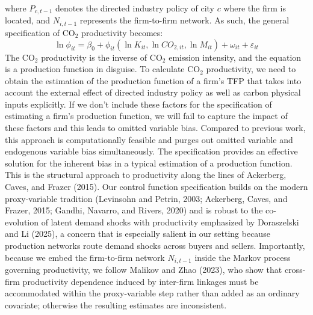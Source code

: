 \documentclass[11pt,a4paper]{article}
\begin{document}
where $P_{c,t-1}$ denotes the directed industry policy of city $c$ where the firm is located, and $N_{i,t-1}$ represents the firm-to-firm network. As such, the general specification of CO$_2$ productivity becomes:
\begin{equation}
\ln\phi_{it} = \beta_0 + \phi_{it}(\ln K_{it}, \ln CO_{2,it}, \ln M_{it}) + \omega_{it} + \varepsilon_{it}
\end{equation}
The CO$_2$ productivity is the inverse of CO$_2$ emission intensity, and the equation is a production function in disguise. To calculate CO$_2$ productivity, we need to obtain the estimation of the production function of a firm's TFP that takes into account the external effect of directed industry policy as well as carbon physical inputs explicitly. If we don't include these factors for the specification of estimating a firm's production function, we will fail to capture the impact of these factors and this leads to omitted variable bias. Compared to previous work, this approach is computationally feasible and purges out omitted variable and endogenous variable bias simultaneously. The specification provides an effective solution for the inherent bias in a typical estimation of a production function. This is the structural approach to productivity along the lines of Ackerberg, Caves, and Frazer (2015). Our control function specification builds on the modern proxy-variable tradition (Levinsohn and Petrin, 2003; Ackerberg, Caves, and Frazer, 2015; Gandhi, Navarro, and Rivers, 2020) and is robust to the co-evolution of latent demand shocks with productivity emphasized by Doraszelski and Li (2025), a concern that is especially salient in our setting because production networks route demand shocks across buyers and sellers. Importantly, because we embed the firm-to-firm network $N_{i,t-1}$ inside the Markov process governing productivity, we follow Malikov and Zhao (2023), who show that cross-firm productivity dependence induced by inter-firm linkages must be accommodated within the proxy-variable step rather than added as an ordinary covariate; otherwise the resulting estimates are inconsistent.
\end{document}
